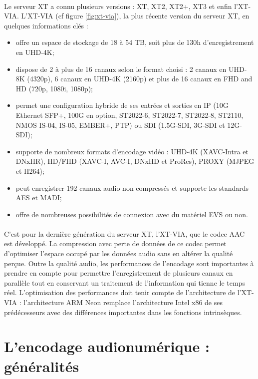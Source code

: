 \documentclass{article}
\begin{document}
    \paragraph{}
    Le serveur XT a connu plusieurs versions : XT, XT2, XT2+, XT3 et enfin l'XT-VIA. L'XT-VIA (cf figure \ref{fig:xt-via}), la plus récente version du serveur XT, en quelques informations clés\cite{EVS:products} :
    \begin{itemize}
        \item offre un espace de stockage de 18 à 54 TB, soit plus de 130h d'enregistrement en UHD-4K;
        \item dispose de 2 à plus de 16 canaux selon le format choisi : 2 canaux en UHD-8K (4320p), 6 canaux en UHD-4K (2160p) et plus de 16 canaux en FHD and HD (720p, 1080i, 1080p);
        \item permet une configuration hybride de ses entrées et sorties en IP (10G Ethernet SFP+, 100G en option, ST2022-6, ST2022-7, ST2022-8, ST2110, NMOS IS-04, IS-05, EMBER+, PTP) ou SDI (1.5G-SDI, 3G-SDI et 12G-SDI);
        \item supporte de nombreux formats d'encodage vidéo : UHD-4K (XAVC-Intra et DNxHR), HD/FHD (XAVC-I, AVC-I, DNxHD et ProRes), PROXY (MJPEG et H264);
        \item peut enregistrer 192 canaux audio non compressés et supporte les standards AES et MADI;
        \item offre de nombreuses possibilités de connexion avec du matériel EVS ou non.
    \end{itemize}

    \paragraph{}
    C'est pour la dernière génération du serveur XT, l'XT-VIA, que le codec AAC est développé. La compression avec perte de données de ce codec permet d'optimiser l'espace occupé par les données audio sans en altérer la qualité perçue. Outre la qualité audio, les performances de l'encodage sont importantes à prendre en compte pour permettre l'enregistrement de plusieurs canaux en parallèle tout en conservant un traitement de l'information qui tienne le temps réel. L'optimisation des performances doit tenir compte de l'architecture de l'XT-VIA : l'architecture ARM Neon remplace l'architecture Intel x86 de ses prédécesseurs avec des différences importantes dans les fonctions intrinsèques.


    \newpage
    \section{L'encodage audionumérique : généralités}
\end{document}
